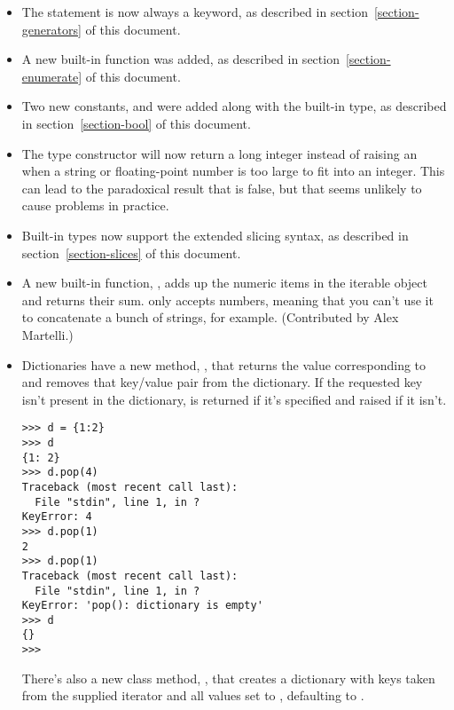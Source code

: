 \documentclass{howto}
\begin{document}
\begin{itemize}
\item The  statement is now always a keyword, as
described in section~\ref{section-generators} of this document.

\item A new built-in function 
was added, as described in section~\ref{section-enumerate} of this
document.

\item Two new constants,  and  were
added along with the built-in  type, as described in
section~\ref{section-bool} of this document.

\item The  type constructor will now return a long
integer instead of raising an  when a string
or floating-point number is too large to fit into an integer.  This
can lead to the paradoxical result that
 is false, but that seems
unlikely to cause problems in practice.

\item Built-in types now support the extended slicing syntax,
as described in section~\ref{section-slices} of this document.

\item A new built-in function, , 
adds up the numeric items in the iterable object and returns their sum. 
 only accepts numbers, meaning that you can't use it
to concatenate a bunch of strings, for example.   (Contributed by Alex
Martelli.)

\item Dictionaries have a new method, , that returns the value corresponding to 
and removes that key/value pair from the dictionary.  If the requested
key isn't present in the dictionary,  is returned if it's
specified and  raised if it isn't.

\begin{verbatim}
>>> d = {1:2}
>>> d
{1: 2}
>>> d.pop(4)
Traceback (most recent call last):
  File "stdin", line 1, in ?
KeyError: 4
>>> d.pop(1)
2
>>> d.pop(1)
Traceback (most recent call last):
  File "stdin", line 1, in ?
KeyError: 'pop(): dictionary is empty'
>>> d
{}
>>>
\end{verbatim}

There's also a new class method, 
, that 
creates a dictionary with keys taken from the supplied iterator
 and all values set to , defaulting to
.  


\end{itemize}
\end{document}
